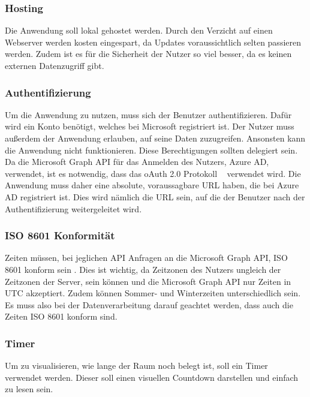\subsubsection{Hosting}\label{subsubsec:hosting}
Die Anwendung soll lokal gehostet werden.
Durch den Verzicht auf einen Webserver werden kosten eingespart, da Updates voraussichtlich selten passieren werden.
Zudem ist es für die Sicherheit der Nutzer so viel besser, da es keinen externen Datenzugriff gibt.
\subsubsection{Authentifizierung}\label{subsubsec:authentifizierung}
Um die Anwendung zu nutzen, muss sich der Benutzer authentifizieren.
Dafür wird ein Konto benötigt, welches bei Microsoft registriert ist.
Der Nutzer muss außerdem der Anwendung erlauben, auf seine Daten zuzugreifen.
Ansonsten kann die Anwendung nicht funktionieren.
Diese Berechtigungen sollten delegiert sein.
Da die Microsoft Graph API für das Anmelden des Nutzers, Azure AD, verwendet, ist es notwendig, dass das oAuth 2.0 Protokoll ~\cite{OAuth-2.0-Simplified} verwendet wird.
Die Anwendung muss daher eine absolute, voraussagbare URL haben, die bei Azure AD registriert ist.
Dies wird nämlich die URL sein, auf die der Benutzer nach der Authentifizierung weitergeleitet wird.
\subsubsection{ISO 8601 Konformität}\label{subsubsec:iso-8601-konformitaet}
Zeiten müssen, bei jeglichen API Anfragen an die Microsoft Graph API, ISO 8601 konform sein \@.
Dies ist wichtig, da Zeitzonen des Nutzers ungleich der Zeitzonen der Server, sein können und die Microsoft Graph API nur Zeiten in UTC akzeptiert.
Zudem können Sommer- und Winterzeiten unterschiedlich sein.
Es muss also bei der Datenverarbeitung darauf geachtet werden, dass auch die Zeiten ISO 8601 konform sind.
\subsubsection{Timer}\label{subsubsec:timer}
Um zu visualisieren, wie lange der Raum noch belegt ist, soll ein Timer verwendet werden.
Dieser soll einen visuellen Countdown darstellen und einfach zu lesen sein.
